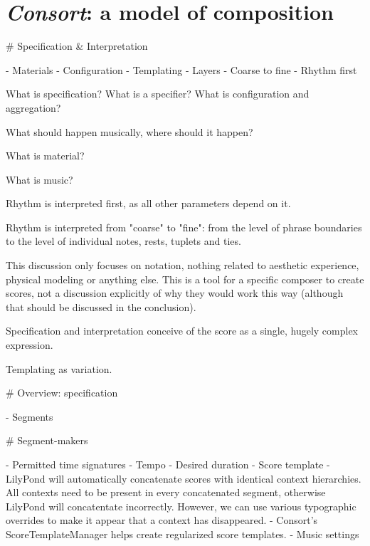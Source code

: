 \chapter{\emph{Consort}: a model of composition}

\begin{comment}
<abjad>[hide=true]
import collections
import consort
</abjad>
\end{comment}

\begin{markdown}

#   Specification & Interpretation

-   Materials
-   Configuration
-   Templating
-   Layers
-   Coarse to fine
-   Rhythm first

What is specification? What is a specifier? What is configuration and
aggregation?

What should happen musically, where should it happen?

What is material?

What is music?

Rhythm is interpreted first, as all other parameters depend on it.

Rhythm is interpreted from "coarse" to "fine": from the level of phrase
boundaries to the level of individual notes, rests, tuplets and ties.

This discussion only focuses on notation, nothing related to aesthetic
experience, physical modeling or anything else. This is a tool for a specific
composer to create scores, not a discussion explicitly of why they would work
this way (although that should be discussed in the conclusion).

Specification and interpretation conceive of the score as a single, hugely
complex expression.

Templating as variation.

#   Overview: specification

-   Segments

#   Segment-makers

-   Permitted time signatures
-   Tempo
-   Desired duration
-   Score template
    -   LilyPond will automatically concatenate scores with identical
        context hierarchies. All contexts need to be present in every
        concatenated segment, otherwise LilyPond will concatentate
        incorrectly. However, we can use various typographic overrides to
        make it appear that a context has disappeared.
    -   Consort's ScoreTemplateManager helps create regularized score
        templates.
-   Music settings


\end{markdown}
